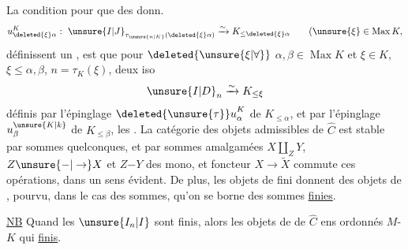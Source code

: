 La condition pour que des donn.
\[
u^K_{\deleted{\xi}\alpha}:\ {\unsure{I|J}}_{\tau_{\unsure{n|K}}(\deleted{\xi}\alpha)}
   \xrightarrow{\sim} K_{\leq\deleted{\xi}\alpha}\qquad
   (\unsure{\xi}\in\operatorname{Max}K,
\]
définissent un , est que pour $\deleted{\unsure{\xi|\forall}}$ $\alpha,\beta\in\operatorname{Max}K$ et $\xi\in K$, $\xi\leq\alpha,\beta$,  $n=\tau_K(\xi)$,  deux iso
\[
{\unsure{I|D}}_n\xrightarrow{\sim}K_{\leq\xi}
\]
définis par l'épinglage  $ {\deleted{\unsure{\tau}}u}^K_\alpha$ de $K_{\leq\alpha}$, et par l'épinglage $u^{\unsure{K|k}}_\beta$ de $K_{\leq\beta}$,  les .
La catégorie des objets admissibles de $\widehat C$ est stable par  sommes quelconques, et par sommes amalgamées $X\amalg_Z Y$,  $Z\unsure{\mathord{-}|\to}X$ et $Z\mathord{-}Y$ des mono, et  foncteur $X\to\widetilde X$ commute  ces opérations, dans un sens évident. De plus, les objets de  fini donnent des objets de , pourvu, \unsure{(}dans le cas des sommes\unsure{)|,}, qu'on se borne  des sommes \uline{finies}.

\uline{NB} Quand les $\unsure{I_n|I}$ sont finis, alors les objets  de  de $\widehat C$   ens ordonnés $M$- $K$ qui  \uline{finis}.
